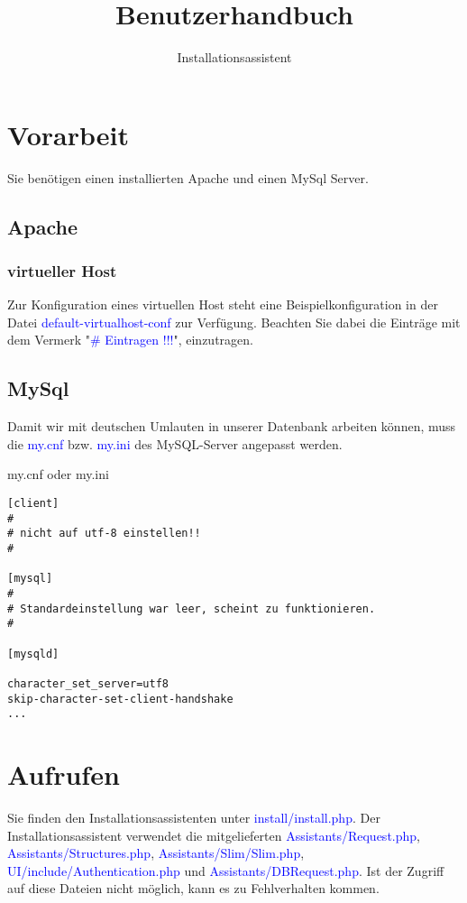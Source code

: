 \documentclass[10pt,a4paper,final,parskip]{scrartcl}
\title
{Benutzerhandbuch}
\author 
{}
\date{\vspace{12cm}\monthword{\the\month}\space\the\year}
\subtitle
{Installationsassistent}
\numberwithin{equation}{section}
\newcommand{\blau}[1]{\textcolor{blue}{#1}}
\newenvironment{Bilder}
  {\par\raggedbottom\null\noindent\minipage{\textwidth}\centering}
  {\endminipage\vspace{0.7cm}}
\newcommand{\dbild}[3]{%
\begin{Bilder}
 \fbox{\texttt{[image: Images/\#1]}}
	\captionof{figure}{#2}
	\label{#3}
	\end{Bilder}
}
\begin{document}
\cleardoublepage
\maketitle

\cleardoublepage
\tableofcontents


\cleardoublepage
\pagestyle{seite}

\section{Vorarbeit}
Sie benötigen einen installierten Apache und einen MySql Server.

\subsection{Apache}
\subsubsection*{virtueller Host}
Zur Konfiguration eines virtuellen Host steht eine Beispielkonfiguration in der Datei \blau{default-virtualhost-conf} zur Verfügung. Beachten Sie dabei die Einträge mit dem Vermerk "\blau{\# Eintragen !!!}", einzutragen.

\subsection{MySql}
Damit wir mit deutschen Umlauten in unserer Datenbank arbeiten können, muss die \blau{my.cnf} bzw. \blau{my.ini} des MySQL-Server angepasst werden.

\begin{minipage}{\textwidth}
my.cnf oder my.ini
\begin{lstlisting}
[client]
#
# nicht auf utf-8 einstellen!!
#

[mysql]
#
# Standardeinstellung war leer, scheint zu funktionieren.
#

[mysqld]

character_set_server=utf8
skip-character-set-client-handshake
...
\end{lstlisting}
\end{minipage}

\section{Aufrufen}
Sie finden den Installationsassistenten unter \blau{install/install.php}. Der Installationsassistent verwendet die mitgelieferten \blau{Assistants/Request.php}, \blau{Assistants/Structures.php}, \blau{Assistants/Slim/Slim.php}, \blau{UI/include/Authentication.php} und \blau{Assistants/DBRequest.php}. Ist der Zugriff auf diese Dateien nicht möglich, kann es zu Fehlverhalten kommen.
\end{document}
